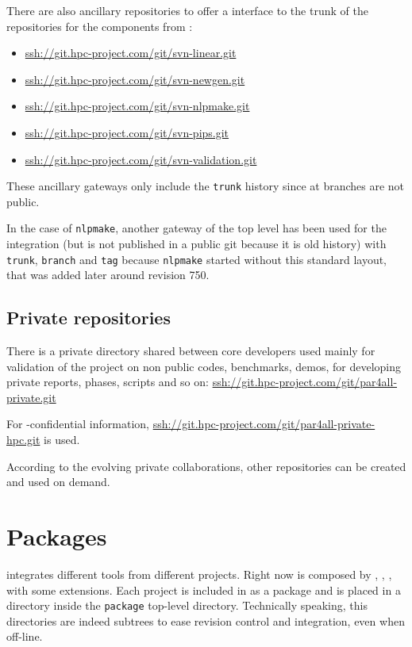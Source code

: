 \documentclass[a4paper]{article}
\begin{document}
There are also ancillary \Agit repositories to offer a \Agit interface to
the trunk of the \Asvn repositories for the \Apips components from
\Acri:
\begin{itemize}
\item \url{ssh://git.hpc-project.com/git/svn-linear.git}
\item \url{ssh://git.hpc-project.com/git/svn-newgen.git}
\item \url{ssh://git.hpc-project.com/git/svn-nlpmake.git}
\item \url{ssh://git.hpc-project.com/git/svn-pips.git}
\item \url{ssh://git.hpc-project.com/git/svn-validation.git}
\end{itemize}
These ancillary gateways only include the \texttt{trunk} history since at
\Acri branches are not public.

In the case of \texttt{nlpmake}, another \Agit{} \Asvn gateway of the top
level has been used for the integration (but is not published in a public
git because it is old history) with \texttt{trunk}, \texttt{branch} and
\texttt{tag} because \texttt{nlpmake} started without this standard
layout, that was added later around revision 750.


\subsection{Private repositories}
\label{sec:private-repositories}

There is a private directory shared between core developers used mainly
for validation of the project on non public codes, benchmarks, demos, for
developing private reports, phases, scripts and so on:
\url{ssh://git.hpc-project.com/git/par4all-private.git}

For \Ahpcp-confidential information,
\url{ssh://git.hpc-project.com/git/par4all-private-hpc.git} is used.

According to the evolving private collaborations, other repositories can
be created and used on demand.


\section{Packages}
\label{sec:packages}

\Apfa integrates different tools from different projects. Right now \Apfa
is composed by \Apips, \Apipsgfc, \Apolylib, with some extensions. Each
project is included in \Apfa as a package and is placed in a directory
inside the \texttt{package} top-level directory. Technically speaking,
this directories are indeed \Agit subtrees to ease revision control and
integration, even when off-line.
\end{document}
